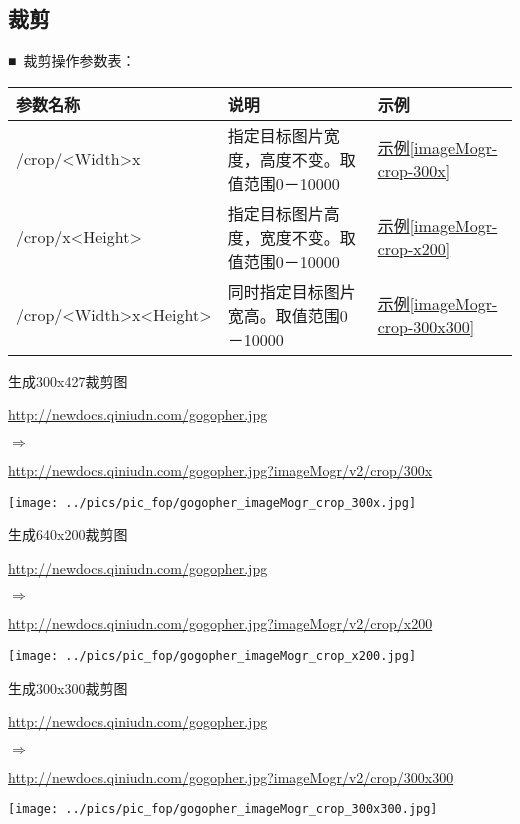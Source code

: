 \documentclass[11pt, oneside]{book}
\newcommand{\qsym}[1]{
\footnotesize
\noindent
#1\par
\normalsize
}
\newcommand{\qpara}[1]{
\vspace{0.3em}
\noindent
#1\par
\vspace{0.3em}
}
\newcommand{\qsamplelink}[1]{
\vspace{0.2em}
\noindent
#1\par
\vspace{0.1em}
}
\newcommand{\qurl}[1]{\footnotesize\url{#1}\normalsize}
\newcommand{\qtable}[1]{\footnotesize\vspace{0.5em}#1\vspace{0.5em}\normalsize}
\newcommand{\qsample}[1]{\hyperref[#1]{示例\ref*{#1}}}
\begin{document}
\clearpage

\subsection{裁剪}

\qpara{■\ 裁剪操作参数表：}
\qtable{
\label{crop-spec}
\begin{tabular}[t]{|l|p{20em}|p{5em}|}
\hline
参数名称 & 说明 & 示例 \\
\hline
/crop/\textless Width\textgreater x & 指定目标图片宽度，高度不变。取值范围0－10000 & \qsample{imageMogr-crop-300x} \\
\hline
/crop/x\textless Height\textgreater & 指定目标图片高度，宽度不变。取值范围0－10000 & \qsample{imageMogr-crop-x200} \\
\hline
/crop/\textless Width\textgreater x\textless Height\textgreater & 同时指定目标图片宽高。取值范围0－10000 & \qsample{imageMogr-crop-300x300} \\
\hline
\end{tabular}
}

\begin{sample}
  \caption{生成300x427裁剪图}
    \qsamplelink{\qurl{http://newdocs.qiniudn.com/gogopher.jpg}}
    \qsym{$\Rightarrow$}
    \qsamplelink{\qurl{http://newdocs.qiniudn.com/gogopher.jpg?imageMogr/v2/crop/300x}}

    \begin{center}
      \texttt{[image: ../pics/pic\_fop/gogopher\_imageMogr\_crop\_300x.jpg]}
    \end{center}
  \label{imageMogr-crop-300x}
\end{sample}

\begin{sample}
  \caption{生成640x200裁剪图}
    \qsamplelink{\qurl{http://newdocs.qiniudn.com/gogopher.jpg}}
    \qsym{$\Rightarrow$}
    \qsamplelink{\qurl{http://newdocs.qiniudn.com/gogopher.jpg?imageMogr/v2/crop/x200}}

    \begin{center}
      \texttt{[image: ../pics/pic\_fop/gogopher\_imageMogr\_crop\_x200.jpg]}
    \end{center}
  \label{imageMogr-crop-x200}
\end{sample}

\begin{sample}
  \caption{生成300x300裁剪图}
    \qsamplelink{\qurl{http://newdocs.qiniudn.com/gogopher.jpg}}
    \qsym{$\Rightarrow$}
    \qsamplelink{\qurl{http://newdocs.qiniudn.com/gogopher.jpg?imageMogr/v2/crop/300x300}}

    \begin{center}
      \texttt{[image: ../pics/pic\_fop/gogopher\_imageMogr\_crop\_300x300.jpg]}
    \end{center}
  \label{imageMogr-crop-300x300}
\end{sample}
\end{document}
